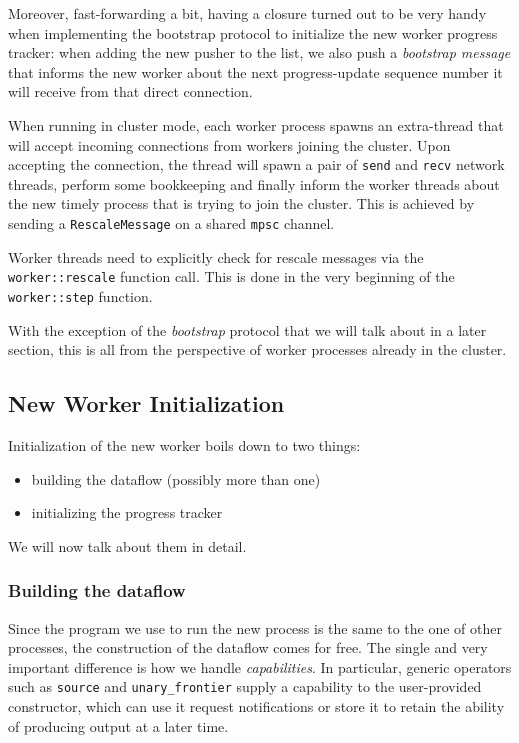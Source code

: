 \documentclass[12pt]{extarticle}
\begin{document}
Moreover, fast-forwarding a bit, having a closure turned out to be very handy when implementing the bootstrap protocol to initialize the new worker
progress tracker: when adding the new pusher to the list, we also push a \textit{bootstrap message} that informs the new worker about the next
progress-update sequence number it will receive from that direct connection.


\vspace{3mm}
\noindent
When running in cluster mode, each worker process spawns an extra-thread that will accept incoming connections from workers joining the cluster.
Upon accepting the connection, the thread will spawn a pair of \verb|send| and \verb|recv| network threads, perform some bookkeeping and
finally inform the worker threads about the new timely process that is trying to join the cluster.
This is achieved by sending a \verb|RescaleMessage| on a shared \verb|mpsc| channel.

Worker threads need to explicitly check for rescale messages via the \verb|worker::rescale| function call.
This is done in the very beginning of the \verb|worker::step| function.

With the exception of the \textit{bootstrap} protocol that we will talk about in a later section,
this is all from the perspective of worker processes already in the cluster.

\subsection{New Worker Initialization}

Initialization of the new worker boils down to two things:
\begin{itemize}
    \item building the dataflow (possibly more than one)
    \item initializing the progress tracker
\end{itemize}

We will now talk about them in detail.

\subsubsection{Building the dataflow}
Since the program we use to run the new process is the same to the one of other processes,
the construction of the dataflow comes for free.
The single and very important difference is how we handle \textit{capabilities}.
In particular, generic operators such as \verb|source| and \verb|unary_frontier| supply
a capability to the user-provided constructor, which can use it request notifications
or store it to retain the ability of producing output at a later time.
\end{document}
